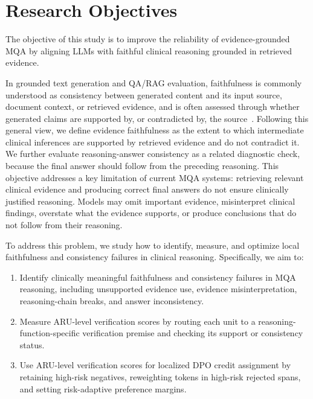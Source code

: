 \documentclass[a4paper,fleqn,doubleblind]{cas-sc}
\begin{document}
\section{Research Objectives}
\label{sec:research_objectives}

The objective of this study is to improve the reliability of evidence-grounded MQA by aligning LLMs with faithful clinical reasoning grounded in retrieved evidence.

In grounded text generation and QA/RAG evaluation, faithfulness is commonly understood as consistency between generated content and its input source, document context, or retrieved evidence, and is often assessed through whether generated claims are supported by, or contradicted by, the source~\cite{maynez-etal-2020-faithfulness,adlakha2024evaluating,saadfalcon2024ares}.
Following this general view, we define evidence faithfulness as the extent to which intermediate clinical inferences are supported by retrieved evidence and do not contradict it.
We further evaluate reasoning-answer consistency as a related diagnostic check, because the final answer should follow from the preceding reasoning.
This objective addresses a key limitation of current MQA systems: retrieving relevant clinical evidence and producing correct final answers do not ensure clinically justified reasoning.
Models may omit important evidence, misinterpret clinical findings, overstate what the evidence supports, or produce conclusions that do not follow from their reasoning.

To address this problem, we study how to identify, measure, and optimize local faithfulness and consistency failures in clinical reasoning.
Specifically, we aim to:
\begin{enumerate}[label=(\arabic*), noitemsep]
\item Identify clinically meaningful faithfulness and consistency failures in MQA reasoning, including unsupported evidence use, evidence misinterpretation, reasoning-chain breaks, and answer inconsistency.
\item Measure ARU-level verification scores by routing each unit to a reasoning-function-specific verification premise and checking its support or consistency status.
\item Use ARU-level verification scores for localized DPO credit assignment by retaining high-risk negatives, reweighting tokens in high-risk rejected spans, and setting risk-adaptive preference margins.
\end{enumerate}
\end{document}
